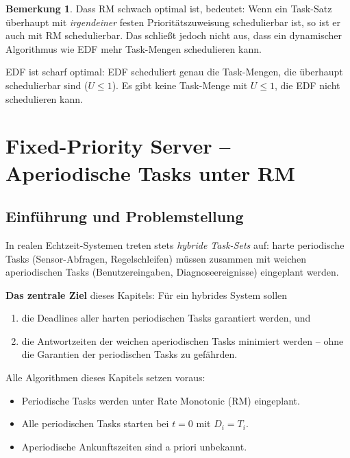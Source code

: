 ﻿\documentclass[a4paper,12pt]{report}
\theoremstyle{definition}
\newtheorem{bemerkung}{Bemerkung}[chapter]
\begin{document}
\begin{bemerkung}
	Dass RM schwach optimal ist, bedeutet: Wenn ein Task-Satz überhaupt
	mit \emph{irgendeiner} festen Prioritätszuweisung schedulierbar ist, so
	ist er auch mit RM schedulierbar. Das schließt jedoch nicht aus, dass
	ein dynamischer Algorithmus wie EDF mehr Task-Mengen schedulieren kann.

	EDF ist scharf optimal: EDF scheduliert genau die Task-Mengen, die
	überhaupt schedulierbar sind ($U \leq 1$). Es gibt keine Task-Menge
	mit $U \leq 1$, die EDF nicht schedulieren kann.
\end{bemerkung}

\chapter{Fixed-Priority Server -- Aperiodische Tasks unter RM}
\label{chap:server}

\section{Einführung und Problemstellung}

In realen Echtzeit-Systemen treten stets \emph{hybride Task-Sets} auf: harte
periodische Tasks (Sensor-Abfragen, Regelschleifen) müssen zusammen mit weichen
aperiodischen Tasks (Benutzereingaben, Diagnoseereignisse) eingeplant werden.

\textbf{Das zentrale Ziel} dieses Kapitels: Für ein hybrides System sollen
\begin{enumerate}
	\item die Deadlines aller harten periodischen Tasks garantiert werden, und
	\item die Antwortzeiten der weichen aperiodischen Tasks minimiert werden --
	      ohne die Garantien der periodischen Tasks zu gefährden.
\end{enumerate}

Alle Algorithmen dieses Kapitels setzen voraus:
\begin{itemize}
	\item Periodische Tasks werden unter Rate Monotonic (RM) eingeplant.
	\item Alle periodischen Tasks starten bei $t=0$ mit $D_i = T_i$.
	\item Aperiodische Ankunftszeiten sind a priori unbekannt.
\end{itemize}
\end{document}
